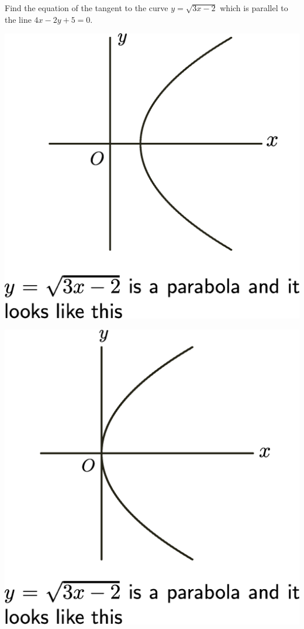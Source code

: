 \documentclass[14pt,fleqn]{extarticle}
\begin{document}
Find the equation of the tangent to the 
curve $y = \sqrt{3x - 2}$ which is parallel to the 
line $4x-2y +5 =0$.
%

\newcard 
\includegraphics[scale=0.4]{r-1.eps} 

\newcard 
\includegraphics[scale=0.4]{w-1.eps}
\end{document}
